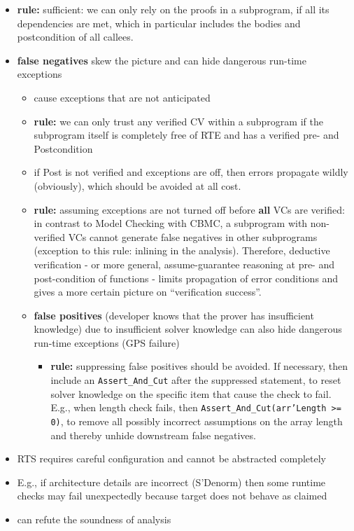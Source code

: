 \begin{itemize}
\item \textbf{rule:} sufficient: we can only rely on the proofs in a
  subprogram, if all its dependencies are met, which in particular
  includes the bodies and postcondition of all callees.
\item \textbf{false negatives} skew the picture and can hide dangerous run-time exceptions
  \begin{itemize}
  \item cause exceptions that are not anticipated
  \item \textbf{rule:} we can only trust any verified CV within a subprogram if the subprogram itself is completely free of RTE and has a verified pre- and Postcondition
  \item if Post is not verified and exceptions are off, then errors propagate wildly (obviously), which should be avoided at all cost. 
  \item \textbf{rule:} assuming exceptions are not turned off before \textbf{all} VCs are verified: in contrast to Model Checking with CBMC, a subprogram with non-verified VCs cannot generate false negatives in other subprograms (exception to this rule: inlining in the analysis). Therefore, deductive verification - or more general, assume-guarantee reasoning at pre- and post-condition of functions - limits propagation of error conditions and gives a more certain picture on ``verification success''.
  \item \textbf{false positives} (developer knows that the prover has insufficient knowledge) due to insufficient solver knowledge can also hide dangerous run-time exceptions (GPS failure)
    \begin{itemize}
    \item \textbf{rule:} suppressing false positives should be avoided. If necessary, then include an \texttt{Assert\_And\_Cut} after the suppressed statement, to reset solver knowledge on the specific item that cause the check to fail. E.g., when length check fails, then \texttt{Assert\_And\_Cut(arr'Length >= 0)}, to remove all possibly incorrect assumptions on the array length and thereby unhide downstream false negatives.
    \end{itemize}
  \end{itemize}
  \item RTS requires careful configuration and cannot be abstracted completely
  \item E.g., if architecture details are incorrect (S'Denorm) then
    some runtime checks may fail unexpectedly because target does not
    behave as claimed
  \item can refute the soundness of analysis

\end{itemize}



